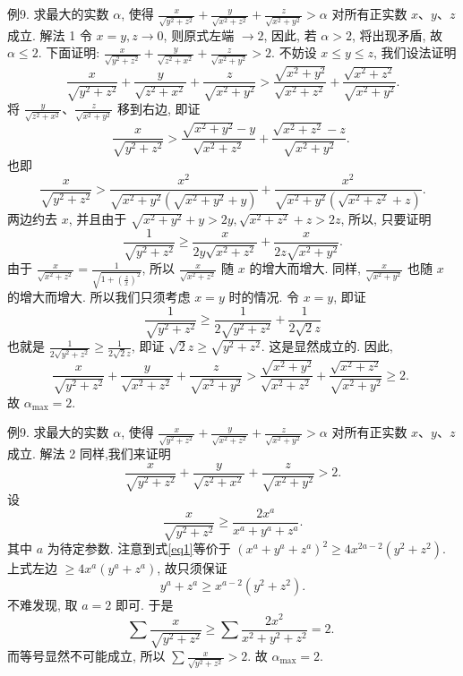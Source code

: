 例9. 求最大的实数 $\alpha$, 使得 $\frac{x}{\sqrt{y^2+z^2}}+\frac{y}{\sqrt{x^2+z^2}}+\frac{z}{\sqrt{x^2+y^2}}>\alpha$ 对所有正实数 $x 、 y 、 z$ 成立.
解法 1 令 $x=y, z \rightarrow 0$, 则原式左端 $\rightarrow 2$, 因此, 若 $\alpha>2$, 将出现矛盾, 故 $\alpha \leqslant 2$.
下面证明: $\frac{x}{\sqrt{y^2+z^2}}+\frac{y}{\sqrt{z^2+x^2}}+\frac{z}{\sqrt{x^2+y^2}}>2$.
不妨设 $x \leqslant y \leqslant z$, 我们设法证明
$$
\frac{x}{\sqrt{y^2+z^2}}+\frac{y}{\sqrt{z^2+x^2}}+\frac{z}{\sqrt{x^2+y^2}}>\frac{\sqrt{x^2+y^2}}{\sqrt{x^2+z^2}}+\frac{\sqrt{x^2+z^2}}{\sqrt{x^2+y^2}} .
$$
将 $\frac{y}{\sqrt{z^2+x^2}} 、 \frac{z}{\sqrt{x^2+y^2}}$ 移到右边, 即证
$$
\frac{x}{\sqrt{y^2+z^2}}>\frac{\sqrt{x^2+y^2}-y}{\sqrt{x^2+z^2}}+\frac{\sqrt{x^2+z^2}-z}{\sqrt{x^2+y^2}} \text {. }
$$
也即
$$
\frac{x}{\sqrt{y^2+z^2}}>\frac{x^2}{\sqrt{x^2+y^2}\left(\sqrt{x^2+y^2}+y\right)}+\frac{x^2}{\sqrt{x^2+y^2}\left(\sqrt{x^2+z^2}+z\right)} .
$$
两边约去 $x$, 并且由于 $\sqrt{x^2+y^2}+y>2 y, \sqrt{x^2+z^2}+z>2 z$, 所以, 只要证明
$$
\frac{1}{\sqrt{y^2+z^2}} \geqslant \frac{x}{2 y \sqrt{x^2+z^2}}+\frac{x}{2 z \sqrt{x^2+y^2}} .
$$
由于 $\frac{x}{\sqrt{x^2+z^2}}=\frac{1}{\sqrt{1+\left(\frac{z}{x}\right)^2}}$, 所以 $\frac{x}{\sqrt{x^2+z^2}}$ 随 $x$ 的增大而增大.
同样, $\frac{x}{\sqrt{x^2+y^2}}$ 也随 $x$ 的增大而增大.
所以我们只须考虑 $x=y$ 时的情况.
令 $x=y$, 即证
$$
\frac{1}{\sqrt{y^2+z^2}} \geqslant \frac{1}{2 \sqrt{y^2+z^2}}+\frac{1}{2 \sqrt{2} z}
$$
也就是 $\frac{1}{2 \sqrt{y^2+z^2}} \geqslant \frac{1}{2 \sqrt{2} z}$, 即证 $\sqrt{2} z \geqslant \sqrt{y^2+z^2}$.
这是显然成立的.
因此,
$$
\frac{x}{\sqrt{y^2+z^2}}+\frac{y}{\sqrt{x^2+z^2}}+\frac{z}{\sqrt{x^2+y^2}}>\frac{\sqrt{x^2+y^2}}{\sqrt{x^2+z^2}}+\frac{\sqrt{x^2+z^2}}{\sqrt{x^2+y^2}} \geqslant 2 \text {. }
$$
故 $\alpha_{\max }=2$.



例9. 求最大的实数 $\alpha$, 使得 $\frac{x}{\sqrt{y^2+z^2}}+\frac{y}{\sqrt{x^2+z^2}}+\frac{z}{\sqrt{x^2+y^2}}>\alpha$ 对所有正实数 $x 、 y 、 z$ 成立.
解法 2 同样,我们来证明
$$
\frac{x}{\sqrt{y^2+z^2}}+\frac{y}{\sqrt{z^2+x^2}}+\frac{z}{\sqrt{x^2+y^2}}>2 .
$$
设
$$
\frac{x}{\sqrt{y^2+z^2}} \geqslant \frac{2 x^a}{x^a+y^a+z^a} . \label{eq1}
$$
其中 $a$ 为待定参数.
注意到式\ref{eq1}等价于 $\left(x^a+y^a+z^a\right)^2 \geqslant 4 x^{2 a-2}\left(y^2+z^2\right)$.
上式左边 $\geqslant 4 x^a\left(y^a+z^a\right)$, 故只须保证
$$
y^a+z^a \geqslant x^{a-2}\left(y^2+z^2\right) .
$$
不难发现, 取 $a=2$ 即可.
于是
$$
\sum \frac{x}{\sqrt{y^2+z^2}} \geqslant \sum \frac{2 x^2}{x^2+y^2+z^2}=2 \text {. }
$$
而等号显然不可能成立, 所以 $\sum \frac{x}{\sqrt{y^2+z^2}}>2$.
故 $\alpha_{\max }=2$.



